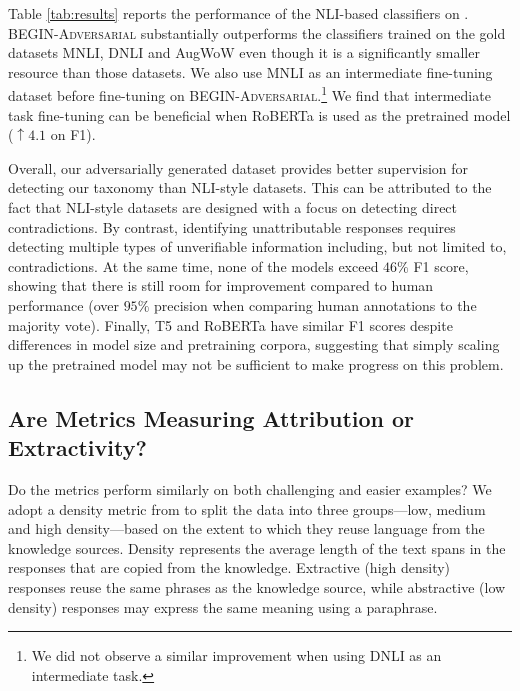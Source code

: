  Table \ref{tab:results} reports the performance of the NLI-based classifiers on \begindata{}. \textsc{BEGIN-Adversarial} substantially outperforms the classifiers trained on the gold datasets MNLI, DNLI and AugWoW even though it is a significantly smaller resource than those datasets. We also use MNLI as an intermediate fine-tuning dataset before fine-tuning on \textsc{BEGIN-Adversarial}.\footnote{We did not observe a similar improvement when using DNLI as an intermediate task.} 
We find that intermediate task fine-tuning can be beneficial when RoBERTa is used as the pretrained model ($\uparrow4.1$ on F1). 

Overall, our adversarially generated dataset provides better supervision for detecting our taxonomy than NLI-style datasets. 
This can be attributed to the fact that  NLI-style datasets are designed with a focus on detecting direct contradictions. 
By contrast, identifying unattributable responses requires detecting multiple types of unverifiable information including, but not limited to, contradictions. %
At the same time, none of the models exceed $46\%$ F1 score, showing that there is still room for improvement compared to human performance (over $95\%$ precision when comparing human annotations to the majority vote). Finally, \textsc{T5} and RoBERTa have similar F1 scores despite differences in model size and pretraining corpora, suggesting that simply scaling up the pretrained model may not be sufficient to make progress on this problem. 
 

 
 \subsection{Are Metrics Measuring Attribution or Extractivity?} 
Do the metrics perform similarly on both challenging and easier examples? We adopt a density metric from \citet{grusky2018newsroom} to split the data into three groups---low, medium and high density---based on the extent to which they reuse language from the knowledge sources. Density represents the average length of the text spans in the responses that are copied from the knowledge. Extractive (high density) responses reuse the same phrases as the knowledge source, while abstractive (low density) responses may express the same meaning using a paraphrase. 


